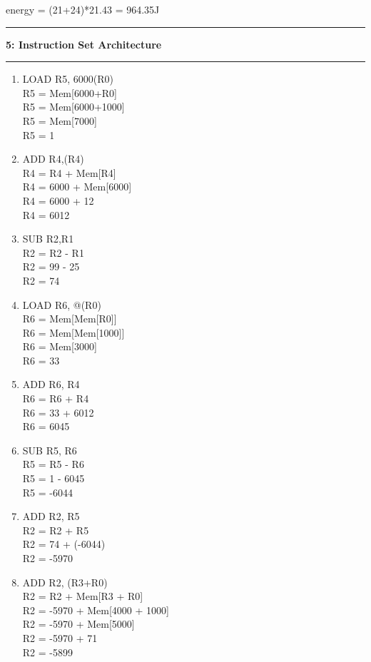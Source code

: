 \documentclass[11pt]{article}
\newcommand\question[2]{\vspace{.25in}\hrule\textbf{#1: #2}\vspace{.5em}\hrule\vspace{.10in}}
\begin{document}
energy = (21+24)*21.43 = 964.35J

\question{5}{Instruction Set Architecture}

\begin{enumerate}
\item LOAD R5, 6000(R0)\\
R5 = Mem[6000+R0]\\
R5 = Mem[6000+1000]\\
R5 = Mem[7000]\\
R5 = 1\\
\item ADD R4,(R4)\\
R4 = R4 + Mem[R4]\\
R4 = 6000 + Mem[6000]\\
R4 = 6000 + 12\\
R4 = 6012\\
\item SUB R2,R1\\
R2 = R2 - R1\\
R2 = 99 - 25\\
R2 = 74\\
\item LOAD R6, @(R0)\\
R6 = Mem[Mem[R0]]\\
R6 = Mem[Mem[1000]]\\
R6 = Mem[3000]\\
R6 = 33\\
\item ADD R6, R4\\
R6 = R6 + R4\\
R6 = 33 + 6012\\
R6 = 6045\\
\item SUB R5, R6\\
R5 = R5 - R6\\
R5 = 1 - 6045\\
R5 = -6044\\
\item ADD R2, R5\\
R2 = R2 + R5\\
R2 = 74 + (-6044)\\
R2 = -5970\\
\item ADD R2, (R3+R0)\\
R2 = R2 + Mem[R3 + R0]\\
R2 = -5970 + Mem[4000 + 1000]\\
R2 = -5970 + Mem[5000]\\
R2 = -5970 + 71\\
R2 = -5899\\

\end{enumerate}
\end{document}

